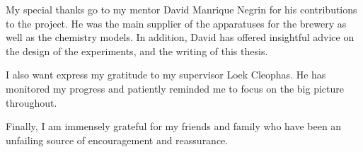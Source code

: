 My special thanks go to my mentor David Manrique Negrin for his contributions to the project. He was the main supplier of the apparatuses for the brewery as well as the chemistry models. In addition, David has offered insightful advice on the design of the experiments, and the writing of this thesis.

I also want express my gratitude to my supervisor Loek Cleophas. He has monitored my progress and patiently reminded me to focus on the big picture throughout.

Finally, I am immensely grateful for my friends and family who have been an unfailing source of encouragement and reassurance. 